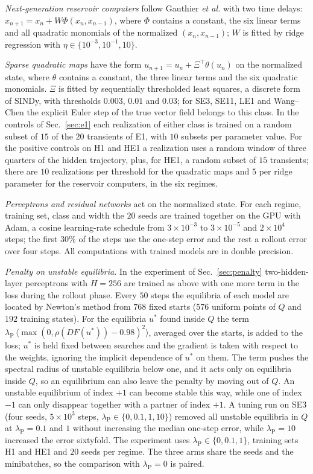 \emph{Next-generation reservoir computers} follow Gauthier \textit{et al.}\cite{Gauthier2021NGRC} with two time delays:
$x_{n+1}=x_n+W\Phi(x_n,x_{n-1})$, where $\Phi$ contains a constant, the six linear terms and all quadratic monomials of the
normalized $(x_n,x_{n-1})$; $W$ is fitted by ridge regression with $\eta\in\{10^{-3},10^{-1},10\}$.

\emph{Sparse quadratic maps} have the form $u_{n+1}=u_n+\Xi^{\top}\theta(u_n)$ on the normalized state, where $\theta$ contains
a constant, the three linear terms and the six quadratic monomials. $\Xi$ is fitted by sequentially thresholded least
squares, a discrete form of SINDy,\cite{Brunton2016SINDy} with thresholds $0.003$, $0.01$ and $0.03$; for SE3, SE11, LE1 and
Wang--Chen the explicit Euler step of the true vector field belongs to this class. In the controls of
Sec.~\ref{sec:e1} each realization of either class is trained on a random subset of $15$ of the $20$ transients of E1,
with $10$ subsets per parameter value. For the positive controls on H1 and HE1 a realization uses a random window of
three quarters of the hidden trajectory, plus, for HE1, a random subset of $15$ transients; there are $10$ realizations
per threshold for the quadratic maps and $5$ per ridge parameter for the reservoir computers, in the six regimes.

\emph{Perceptrons and residual networks} act on the normalized state. For each regime, training set, class and width the
$20$ seeds are trained together on the GPU with Adam, a cosine learning-rate schedule from $3\times10^{-3}$ to $3\times10^{-5}$
and $2\times10^4$ steps; the first $30\%$ of the steps use the one-step error and the rest a rollout error over four steps.
All computations with trained models are in double precision.

\emph{Penalty on unstable equilibria.} In the experiment of Sec.~\ref{sec:penalty} two-hidden-layer perceptrons with $H=256$
are trained as above with one more term in the loss during the rollout phase. Every $50$ steps the equilibria of each model
are located by Newton's method from $768$ fixed starts ($576$ uniform points of $Q$ and $192$ training states). For the
equilibria $u^*$ found inside $Q$ the term $\lambda_{\mathrm{P}}\,\langle\max(0,\rho(DF(u^*))-0.98)^2\rangle$, averaged over the starts,
is added to the loss; $u^*$ is held fixed between searches and the gradient is taken with respect to the weights, ignoring
the implicit dependence of $u^*$ on them. The term pushes the spectral radius of unstable equilibria below one, and it acts
only on equilibria inside $Q$, so an equilibrium can also leave the penalty by moving out of $Q$. An unstable equilibrium of index $+1$ can become stable
this way, while one of index $-1$ can only disappear together with a partner of index $+1$. A tuning run on SE3 (four seeds,
$5\times10^3$ steps, $\lambda_{\mathrm{P}}\in\{0,0.1,1,10\}$) removed all unstable equilibria in $Q$ at $\lambda_{\mathrm{P}}=0.1$ and $1$ without
increasing the median one-step error, while $\lambda_{\mathrm{P}}=10$ increased the error sixtyfold. The experiment uses $\lambda_{\mathrm{P}}\in\{0,0.1,1\}$,
training sets H1 and HE1 and $20$ seeds per regime. The three arms share the seeds and the minibatches, so the comparison
with $\lambda_{\mathrm{P}}=0$ is paired.

